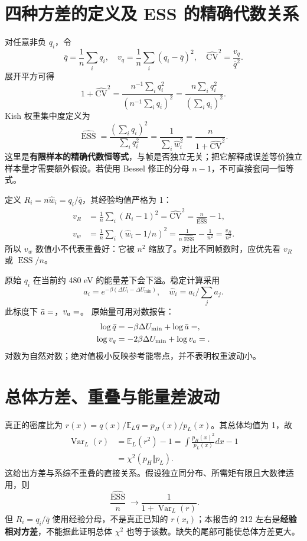 \documentclass[11pt,a4paper]{article}
\newcommand{\E}{\mathbb E}\newcommand{\Var}{\operatorname{Var}}
\newcommand{\ESS}{\operatorname{ESS}}
\begin{document}
\section{四种方差的定义及 ESS 的精确代数关系}
对任意非负 $q_i$，令
\begin{equation}
\bar q=\frac1n\sum_iq_i,\quad v_q=\frac1n\sum_i(q_i-\bar q)^2,
\quad \widehat{\mathrm{CV}}^2=\frac{v_q}{\bar q^2}.
\end{equation}
展开平方可得
\begin{equation}
1+\widehat{\mathrm{CV}}^2
=\frac{n^{-1}\sum_iq_i^2}{(n^{-1}\sum_iq_i)^2}
=\frac{n\sum_iq_i^2}{(\sum_iq_i)^2}.
\end{equation}
Kish 权重集中度定义为
\begin{equation}\boxed{
\widehat{\ESS}=\frac{(\sum_iq_i)^2}{\sum_iq_i^2}
=\frac1{\sum_i\hat w_i^2}
=\frac{n}{1+\widehat{\mathrm{CV}}^2}.}
\end{equation}
这里是\textbf{有限样本的精确代数恒等式}，与帧是否独立无关；把它解释成误差等价独立样本量才需要额外假设。若使用 Bessel 修正的分母 $n-1$，不可直接套同一恒等式。

定义 $R_i=n\hat w_i=q_i/\bar q$，其经验均值严格为 1：
\begin{align}
 v_R&=\frac1n\sum_i(R_i-1)^2=\widehat{\mathrm{CV}}^2
 =\frac n{\widehat{\ESS}}-1,\\
 v_w&=\frac1n\sum_i(\hat w_i-1/n)^2
 =\frac1{n\widehat{\ESS}}-\frac1{n^2}=\frac{v_R}{n^2}.
\end{align}
所以 $v_w$ 数值小不代表重叠好：它被 $n^2$ 缩放了。对比不同帧数时，应优先看 $v_R$ 或 $\ESS/n$。

原始 $q_i$ 在当前约 480 eV 的能量差下会下溢。稳定计算采用
\begin{equation}
a_i=e^{-\beta(\Delta U_i-\Delta U_{\min})},\quad
\hat w_i=a_i/\sum_j a_j.
\end{equation}
此标度下 $\bar a=\csname ShiftedRawMean\endcsname$，$v_a=\csname ShiftedRawVarianceDdof0\endcsname$。
原始量可用对数报告：
\begin{align}
\log\bar q&=-\beta\Delta U_{\min}+\log\bar a
 =\csname LogRawMean\endcsname,\\
\log v_q&=-2\beta\Delta U_{\min}+\log v_a
 =\csname LogRawVariance\endcsname.
\end{align}
对数为自然对数；绝对值极小反映参考能零点，并不表明权重波动小。
\newpage
\section{总体方差、重叠与能量差波动}
真正的密度比为 $r(x)=q(x)/\E_Lq=p_H(x)/p_L(x)$。其总体均值为 1，故
\begin{align}
\Var_L(r)&=\E_L(r^2)-1
 =\int\frac{p_H(x)^2}{p_L(x)}dx-1\\
 &=\chi^2(p_H\Vert p_L).
\end{align}
这给出方差与系综不重叠的直接关系。假设独立同分布、所需矩有限且大数律适用，则
\begin{equation}
\frac{\widehat{\ESS}}n\longrightarrow
\frac1{1+\Var_L(r)}.
\end{equation}
但 $R_i=q_i/\bar q$ 使用经验分母，不是真正已知的 $r(x_i)$；本报告的 212 左右是\textbf{经验相对方差}，不能据此证明总体 $\chi^2$ 也等于该数。缺失的尾部可能使总体方差更大。
\end{document}
